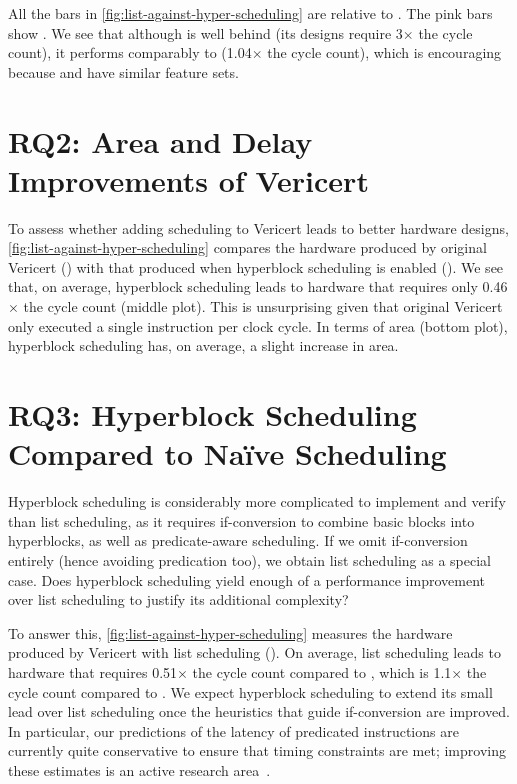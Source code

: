 All the bars in \cref{fig:list-against-hyper-scheduling} are relative to
\BambuDefault. The pink bars show \BambuNoOpt. We see that although
\VericertHyper{} is well behind \BambuDefault{} (its designs require 3$\times$
the cycle count), it performs comparably to \BambuNoOpt{} (1.04$\times$ the
cycle count), which is encouraging because \VericertHyper{} and \BambuNoOpt{}
have similar feature sets.

\section{RQ2: Area and Delay Improvements of Vericert}

To assess whether adding scheduling to Vericert leads to better hardware
designs, \cref{fig:list-against-hyper-scheduling} compares the hardware produced
by original Vericert (\VericertBase{}) with that produced when hyperblock
scheduling is enabled (\VericertHyper{}). We see that, on average, hyperblock
scheduling leads to hardware that requires only 0.46$\times$ the cycle count
(middle plot). This is unsurprising given that original Vericert only executed a
single instruction per clock cycle. In terms of area (bottom plot), hyperblock
scheduling has, on average, a slight increase in area.

\section{RQ3: Hyperblock Scheduling Compared to Na\"ive Scheduling}

Hyperblock scheduling is considerably more complicated to implement and verify
than list scheduling, as it requires if-conversion to combine basic blocks into
hyperblocks, as well as predicate-aware scheduling. If we omit if-conversion
entirely (hence avoiding predication too), we obtain list scheduling as a
special case. Does hyperblock scheduling yield enough of a performance
improvement over list scheduling to justify its additional complexity?

To answer this, \cref{fig:list-against-hyper-scheduling} measures the hardware
produced by Vericert with list scheduling (\VericertList{}). On average, list
scheduling leads to hardware that requires 0.51$\times$ the cycle count compared
to \VericertBase{}, which is 1.1$\times$ the cycle count compared to
\VericertHyper{}. We expect hyperblock scheduling to extend its small lead over
list scheduling once the heuristics that guide if-conversion are improved.  In
particular, our predictions of the latency of predicated instructions are
currently quite conservative to ensure that timing constraints are met;
improving these estimates is an active research
area~\cite{tan15_mappin_lut_fpgas,rizzi23_iterat_method_mappin_aware_frequen,wang23_mapbuf,ustun20_accur_fpga_hls,zheng14_fast_effec_placem_routin_direc}.

